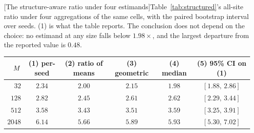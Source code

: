 
\begin{center}
\begin{minipage}{\linewidth}\small\centering
{}[The structure-aware ratio under four estimands]{Table~\ref{tab:structured}'s all-site ratio under four
aggregations of the same cells, with the paired bootstrap interval over seeds.
(1) is what the table reports. The conclusion does not depend on the choice: no
estimand at any size falls below $1.98\times$, and the largest
departure from the reported value is $0.48$.}
\label{tab:aggregation-structured}
\begin{tabular}{rccccc}
\toprule
$M$ & (1) per-seed & (2) ratio of means & (3) geometric & (4) median & (5) 95\% CI on (1) \\
\midrule
$32$ & $2.34$ & $2.00$ & $2.15$ & $1.98$ & $[1.88,\, 2.86]$ \\
$128$ & $2.82$ & $2.45$ & $2.61$ & $2.62$ & $[2.29,\, 3.44]$ \\
$512$ & $3.58$ & $3.43$ & $3.51$ & $3.59$ & $[3.25,\, 3.91]$ \\
$2048$ & $6.14$ & $5.66$ & $5.89$ & $5.93$ & $[5.30,\, 7.02]$ \\
\bottomrule
\end{tabular}
\end{minipage}
\end{center}

